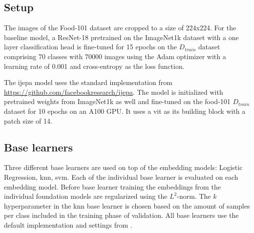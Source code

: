 \subsection{Setup}
The images of the Food-101 dataset are cropped to a size of 224x224.
For the baseline model, a ResNet-18 pretrained on the ImageNet1k dataset with a one layer classification head 
is fine-tuned for 15 epochs on the 
$D_{train}$ dataset comprising 70 classes with 70000 images using the Adam optimizer \cite{kingma_adam_2017} with a
learning rate of 0.001 and cross-entropy as the loss function.

The \gls{ijepa} model uses the standard implementation from \url{https://github.com/facebookresearch/ijepa}. The model 
is initialized with pretrained weights from ImageNet1k as well and fine-tuned on the food-101 $D_{train}$ dataset 
for 10 epochs on an A100 GPU. It uses a \gls{vit} as its building block with a patch size of 14.

\subsection{Base learners}
Three different base learners are used on top of the embedding models: Logistic Regression, \gls{knn}, \gls{svm}.
Each of the individual base learner is evaluated on each embedding model. Before base learner training the embeddings 
from the individual foundation models are regularized using the $L^2$-norm. The $k$ hyperparameter in the \gls{knn}	
base learner is chosen based on the amount of samples per class included in the training phase of validation. 
All base learners use the default implementation and settings from \cite{scikit-learn}.

